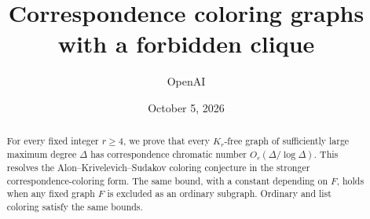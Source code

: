 \documentclass[11pt]{article}
\title{Correspondence coloring graphs with a forbidden clique}
\author{OpenAI}
\date{October 5, 2026}
\begin{document}
\maketitle
\begin{abstract}
For every fixed integer $r\ge4$, we prove that every $K_r$-free graph
of sufficiently large maximum degree $\Delta$ has correspondence chromatic
number $O_r(\Delta/\log\Delta)$. This resolves the Alon--Krivelevich--Sudakov
coloring conjecture in the stronger correspondence-coloring form. The
same bound, with a constant depending on $F$, holds when any fixed graph
$F$ is excluded as an ordinary subgraph. Ordinary and list coloring
satisfy the same bounds.
\end{abstract}
\tableofcontents
\clearpage






\end{document}
